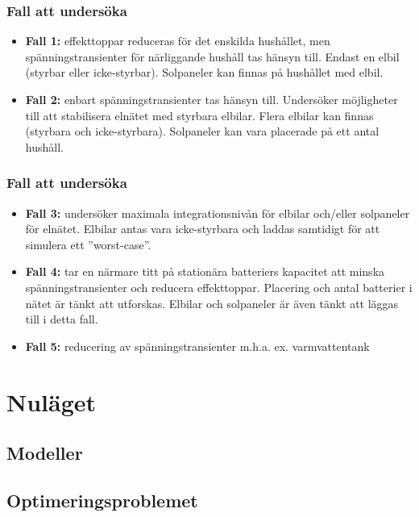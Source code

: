 \documentclass[noamsthm, swedish]{beamer}
\begin{document}
\begin{frame}
\frametitle{Fall att undersöka}
    \begin{itemize}
        \item \textbf{Fall 1:} effekttoppar reduceras för det enskilda hushållet, men spänningstransienter för närliggande hushåll tas hänsyn till. Endast en elbil (styrbar eller icke-styrbar). Solpaneler kan finnas på hushållet med elbil.
    
        \item \textbf{Fall 2:} enbart spänningstransienter tas hänsyn till. Undersöker möjligheter till att stabilisera elnätet med styrbara elbilar. Flera elbilar kan finnas (styrbara och icke-styrbara). Solpaneler kan vara placerade på ett antal hushåll.
    \end{itemize}
\end{frame}

\begin{frame}
\frametitle{Fall att undersöka}
    \begin{itemize}
        \item \textbf{Fall 3:} undersöker maximala integrationsnivån för elbilar och/eller solpaneler för elnätet. Elbilar antas vara icke-styrbara och laddas samtidigt för att simulera ett ''worst-case''. 
    
        \item \textbf{Fall 4:} tar en närmare titt på stationära batteriers kapacitet att minska spänningstransienter och reducera effekttoppar. Placering och antal batterier i nätet är tänkt att utforskas. Elbilar och solpaneler är även tänkt att läggas till i detta fall.
        
        \item \textbf{Fall 5:} reducering av spänningstransienter m.h.a. ex. varmvattentank
    \end{itemize}
\end{frame}
%
\section{Nuläget}

\subsection{Modeller}
\subsection{Optimeringsproblemet}
\end{document}

